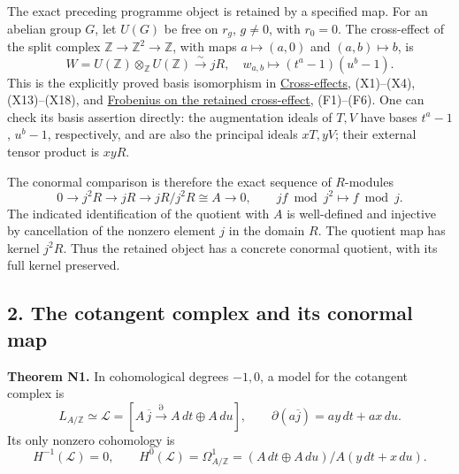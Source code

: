 \documentclass[
]{article}
\begin{document}
The exact preceding programme object is retained by a specified map. For
an abelian group \(G\), let \(U(G)\) be free on \(r_g\), \(g\ne0\), with
\(r_0=0\). The cross-effect of the split complex
\(\mathbb Z\to\mathbb Z^2\to\mathbb Z\), with maps \(a\mapsto(a,0)\) and
\((a,b)\mapsto b\), is \[
W=U(\mathbb Z)\otimes_{\mathbb Z}U(\mathbb Z)
\xrightarrow{\sim}jR,
\quad w_{a,b}\longmapsto(t^a-1)(u^b-1).
\tag{N5}
\] This is the explicitly proved basis isomorphism in
\href{https://github.com/KokunoYumeto/zeta-function-research-reader/blob/6af54ea3c8ef99127af327f3103e086c68d482c2/workbenches/splitzero-tandem/branches/identity-absorber-square/CROSS_EFFECTS.md}{Cross-effects},
(X1)--(X4), (X13)--(X18), and
\href{https://github.com/KokunoYumeto/zeta-function-research-reader/blob/6af54ea3c8ef99127af327f3103e086c68d482c2/workbenches/splitzero-tandem/branches/identity-absorber-square/FROBENIUS_CROSS_EFFECT.md}{Frobenius
on the retained cross-effect}, (F1)--(F6). One can check its basis
assertion directly: the augmentation ideals of \(T,V\) have bases
\(t^a-1\), \(u^b-1\), respectively, and are also the principal ideals
\(xT,yV\); their external tensor product is \(xyR\).

The conormal comparison is therefore the exact sequence of \(R\)-modules
\[
0\longrightarrow j^2R\longrightarrow jR
\longrightarrow jR/j^2R\cong A\longrightarrow0,
\qquad jf\bmod j^2\longmapsto f\bmod j.
\tag{N6}
\] The indicated identification of the quotient with \(A\) is
well-defined and injective by cancellation of the nonzero element \(j\)
in the domain \(R\). The quotient map has kernel \(j^2R\). Thus the
retained object has a concrete conormal quotient, with its full kernel
preserved.

\subsection{2. The cotangent complex and its conormal
map}\label{the-cotangent-complex-and-its-conormal-map}

\textbf{Theorem N1.} In cohomological degrees \(-1,0\), a model for the
cotangent complex is \[
L_{A/\mathbb Z}\simeq
\mathcal L=\left[A\,\overline j
\xrightarrow{\partial}A\,dt\oplus A\,du\right],
\qquad \partial(a\overline j)=ay\,dt+ax\,du.
\tag{N7}
\] Its only nonzero cohomology is \[
H^{-1}(\mathcal L)=0,\qquad
H^0(\mathcal L)=\Omega^1_{A/\mathbb Z}
=(A\,dt\oplus A\,du)/A(y\,dt+x\,du).
\tag{N8}
\]
\end{document}
